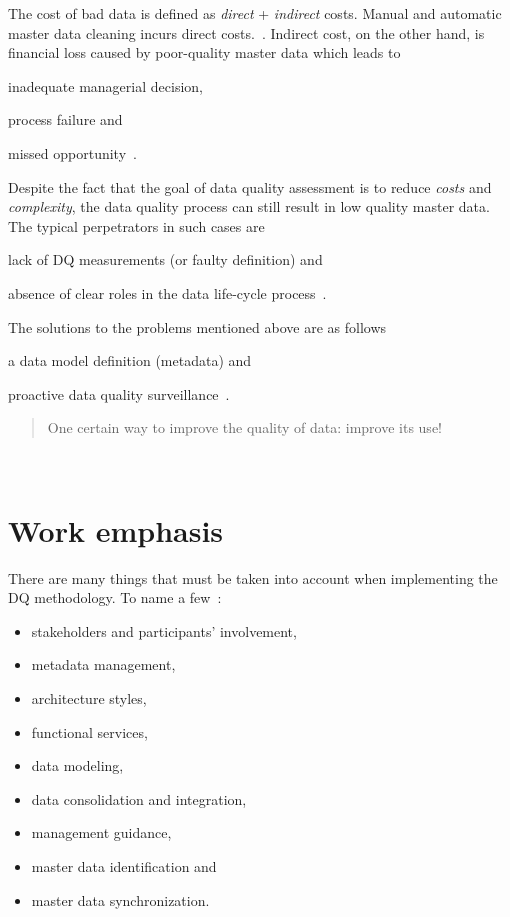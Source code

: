
The cost of bad data is defined as \textit{direct} + \textit{indirect} costs.
Manual and automatic master data cleaning incurs direct costs.~\cite{haug2013}.
Indirect cost, on the other hand, is financial loss caused by poor-quality master data which leads to
\begin{enumerate*}[label=(\roman*)]
    \item inadequate managerial decision,
    \item process failure and
    \item missed opportunity~\cite{haug2013}.
\end{enumerate*}

Despite the fact that the goal of data quality assessment is to reduce \textit{costs} and \textit{complexity}, the data quality process can still result in low quality master data.
The typical perpetrators in such cases are
\begin{enumerate*}[label=(\roman*)]
    \item lack of DQ measurements (or faulty definition) and
    \item absence of clear roles in the data life-cycle process~\cite{haug2013}.
\end{enumerate*}

The solutions to the problems mentioned above are as follows
\begin{enumerate*}[label=(\roman*)]
    \item a data model definition (metadata) and
    \item proactive data quality surveillance~\cite{risto2011}.
\end{enumerate*}

\blockquote[][]{One certain way to improve the quality of data: improve its use!}~\cite{orr1998}

\section*{Work emphasis}

There are many things that must be taken into account when implementing the DQ methodology.
To name a few~\cite{loshin2008}:
\begin{itemize}
    \item stakeholders and participants' involvement,
    \item metadata management,
    \item architecture styles,
    \item functional services,
    \item data modeling,
    \item data consolidation and integration,
    \item management guidance,
    \item master data identification and
    \item master data synchronization.
\end{itemize}

